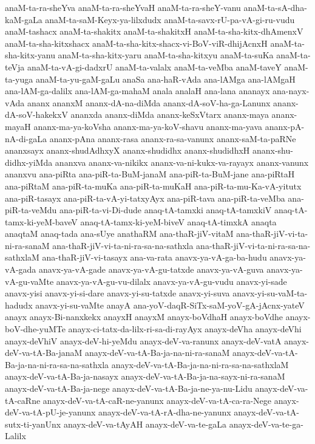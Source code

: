 {anaM-ta-ra-sheYva
anaM-ta-ra-sheYvaH
anaM-ta-ra-sheY-vanu
anaM-ta-sA-dha-kaM-gaLa
anaM-ta-saM-Keyx-ya-lilxdudx
anaM-ta-savx-rU-pa-vA-gi-ru-vudu
anaM-tashacx
anaM-ta-shakitx
anaM-ta-shakitxH
anaM-ta-sha-kitx-dhAmenxV
anaM-ta-sha-kitxshacx
anaM-ta-sha-kitx-shacx-vi-BoV-viR-dhijAcnxH
anaM-ta-sha-kitx-yanu
anaM-ta-sha-kitx-yaru
anaM-ta-sha-kitxyu
anaM-ta-suKa
anaM-ta-teVja
anaM-ta-vA-gi-dadxrU
anaM-ta-valalx
anaM-ta-veMba
anaM-taveY
anaM-ta-yuga
anaM-ta-yu-gaM-gaLu
anaSa
ana-haR-vAda
ana-lAMga
ana-lAMgaH
ana-lAM-ga-dalilx
ana-lAM-ga-mahaM
anala
analaH
ana-lana
ananayx
ana-nayx-vAda
ananx
ananxM
ananx-dA-na-diMda
ananx-dA-soV-ha-ga-Lanunx
ananx-dA-soV-hakekxV
ananxda
ananx-diMda
ananx-keSxVtarx
ananx-maya
ananx-mayaH
ananx-ma-ya-koVsha
ananx-ma-ya-koV-shavu
ananx-ma-yava
ananx-pA-nA-di-gaLa
ananx-pAna
ananx-rasa
ananx-ra-sa-vanunx
ananx-saM-ta-paRNe
ananxsayx
ananx-shudAdhxyX
ananx-shudidhx
ananx-shudidhxH
ananx-shu-didhx-yiMda
ananxva
ananx-va-nikikx
ananx-va-ni-kukx-va-rayayx
ananx-vanunx
ananxvu
ana-piRta
ana-piR-ta-BuM-janaM
ana-piR-ta-BuM-jane
ana-piRtaH
ana-piRtaM
ana-piR-ta-muKa
ana-piR-ta-muKaH
ana-piR-ta-mu-Ka-vA-yitutx
ana-piR-tasayx
ana-piR-ta-vA-yi-tatxyAyx
ana-piR-tava
ana-piR-ta-veMba
ana-piR-ta-veMdu
ana-piR-ta-vi-Di-dude
anaq-tA-tamxki
anaq-tA-tamxkiV
anaq-tA-tamx-ki-yeM-baveV
anaq-tA-tamx-ki-yeM-biveV
anaq-tA-timxkA
anaqta
anaqtaM
anaq-tada
ana-sUye
anathaRM
ana-thaR-jiV-vitaM
ana-thaR-jiV-vi-ta-ni-ra-sanaM
ana-thaR-jiV-vi-ta-ni-ra-sa-na-sathxla
ana-thaR-jiV-vi-ta-ni-ra-sa-na-sathxlaM
ana-thaR-jiV-vi-tasayx
ana-va-rata
anavx-ya-vA-ga-ba-hudu
anavx-ya-vA-gada
anavx-ya-vA-gade
anavx-ya-vA-gu-tatxde
anavx-ya-vA-guva
anavx-ya-vA-gu-vaMte
anavx-ya-vA-gu-vu-dilalx
anavx-ya-vA-gu-vudu
anavx-yi-sade
anavx-yisi
anavx-yi-si-dare
anavx-yi-su-tatxde
anavx-yi-suva
anavx-yi-su-vaM-ta-hadudx
anavx-yi-su-vaMte
anayA
ana-yoV-daqR-SiTx-saM-yoV-gA-jAcnx-yateV
anayx
anayx-Bi-nanxkekx
anayxH
anayxM
anayx-boVdhaH
anayx-boVdhe
anayx-boV-dhe-yuMTe
anayx-ci-tatx-da-lilx-ri-sa-di-rayAyx
anayx-deVha
anayx-deVhi
anayx-deVhiV
anayx-deV-hi-yeMdu
anayx-deV-va-ranunx
anayx-deV-vatA
anayx-deV-va-tA-Ba-janaM
anayx-deV-va-tA-Ba-ja-na-ni-ra-sanaM
anayx-deV-va-tA-Ba-ja-na-ni-ra-sa-na-sathxla
anayx-deV-va-tA-Ba-ja-na-ni-ra-sa-na-sathxlaM
anayx-deV-va-tA-Ba-ja-nasayx
anayx-deV-va-tA-Ba-ja-na-sayx-ni-ra-sanaM
anayx-deV-va-tA-Ba-ja-nege
anayx-deV-va-tA-Ba-ja-ne-ya-nu-Lidu
anayx-deV-va-tA-caRne
anayx-deV-va-tA-caR-ne-yanunx
anayx-deV-va-tA-ca-ra-Nege
anayx-deV-va-tA-pU-je-yanunx
anayx-deV-va-tA-rA-dha-ne-yanunx
anayx-deV-va-tA-sutx-ti-yanUnx
anayx-deV-va-tAyAH
anayx-deV-va-te-gaLa
anayx-deV-va-te-ga-Lalilx
}

